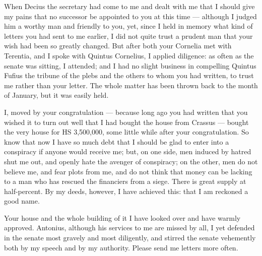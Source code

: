 

 When Decius the secretary had come to me and dealt with me that I should give my pains that no successor be appointed to you at this time --- although I judged him a worthy man and friendly to you, yet, since I held in memory what kind of letters you had sent to me earlier, I did not quite trust a prudent man that your wish had been so greatly changed. But after both your Cornelia met with Terentia, and I spoke with Quintus Cornelius, I applied diligence: as often as the senate was sitting, I attended; and I had no slight business in compelling Quintus Fufius the tribune of the plebs and the others to whom you had written, to trust me rather than your letter. The whole matter has been thrown back to the month of January, but it was easily held.

 I, moved by your congratulation --- because long ago you had written that you wished it to turn out well that I had bought the house from Crassus --- bought the very house for HS 3,500,000, some little while after your congratulation. So know that now I have so much debt that I should be glad to enter into a conspiracy if anyone would receive me; but, on one side, men induced by hatred shut me out, and openly hate the avenger of conspiracy; on the other, men do not believe me, and fear plots from me, and do not think that money can be lacking to a man who has rescued the financiers from a siege. There is great supply at half-percent. By my deeds, however, I have achieved this: that I am reckoned a good name.

 Your house and the whole building of it I have looked over and have warmly approved. Antonius, although his services to me are missed by all, I yet defended in the senate most gravely and most diligently, and stirred the senate vehemently both by my speech and by my authority. Please send me letters more often.
